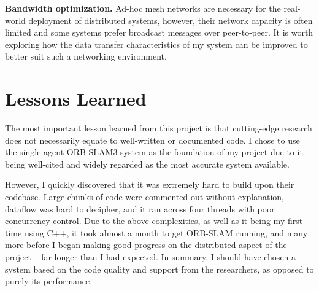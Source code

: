 \textbf{Bandwidth optimization.} Ad-hoc mesh networks are necessary for the real-world deployment of distributed systems, however, their network capacity is often limited and some systems prefer broadcast messages over peer-to-peer. It is worth exploring how the data transfer characteristics of my system can be improved to better suit such a networking environment.

\section{Lessons Learned}
\label{sec:lessons-learned}
The most important lesson learned from this project is that cutting-edge research does not necessarily equate to well-written or documented code. I chose to use the single-agent ORB-SLAM3 system as the foundation of my project due to it being well-cited and widely regarded as the most accurate system available.


However, I quickly discovered that it was extremely hard to build upon their codebase. Large chunks of code were commented out without explanation, dataflow was hard to decipher, and it ran across four threads with poor concurrency control. Due to the above complexities, as well as it being my first time using C++, it took almost a month to get ORB-SLAM running, and many more before I began making good progress on the distributed aspect of the project – far longer than I had expected. In summary, I should have chosen a system based on the code quality and support from the researchers, as opposed to purely its performance.




